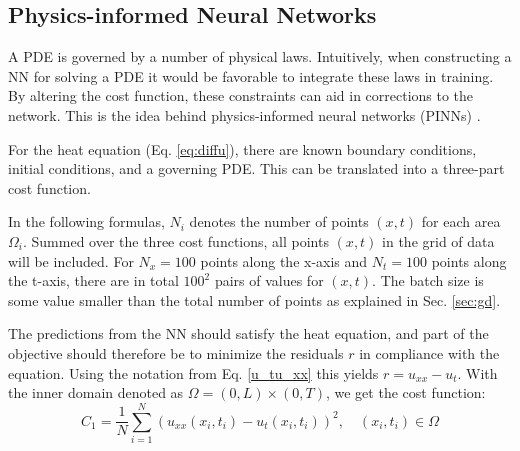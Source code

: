 
\subsection{Physics-informed Neural Networks}\label{sec:PINNs}

A PDE is governed by a number of physical laws. 
Intuitively, when constructing a NN for solving a PDE it would be favorable to integrate these laws in training. By altering the cost function, these constraints can aid in corrections to the network. 
This is the idea behind physics-informed neural networks (PINNs) \cite{PINNs}.

For the heat equation (Eq. \ref{eq:diffu}), there are known boundary conditions, initial conditions, and a governing PDE. 
This can be translated into a three-part cost function.

In the following formulas, $N_i$ denotes the number of points $(x, t)$ for each area $\Omega_i$. Summed over the three cost functions, all points $(x,t)$ in the grid of data will be included. 
For $N_x = 100$ points along the x-axis and $N_t = 100$ points along the t-axis, there are in total $100^2$ pairs of values for $(x,t)$. 
The batch size is some value smaller than the total number of points as explained in Sec. \ref{sec:gd}.


The predictions from the NN should satisfy the heat equation, and part of the objective should therefore be to minimize the residuals $r$ in compliance with the equation. Using the notation from Eq. \ref{u_tu_xx} this yields $r = u_{xx} - u_t$. With the inner domain denoted as $\Omega = (0, L) \times (0, T)$, we get the cost function: 
\begin{equation}
    C_1 = \frac{1}{N}\sum_{i=1}^{N}(u_{xx}(x_i,t_i) - u_t(x_i,t_i))^2, \quad (x_i,t_i) \in \Omega
\end{equation}

